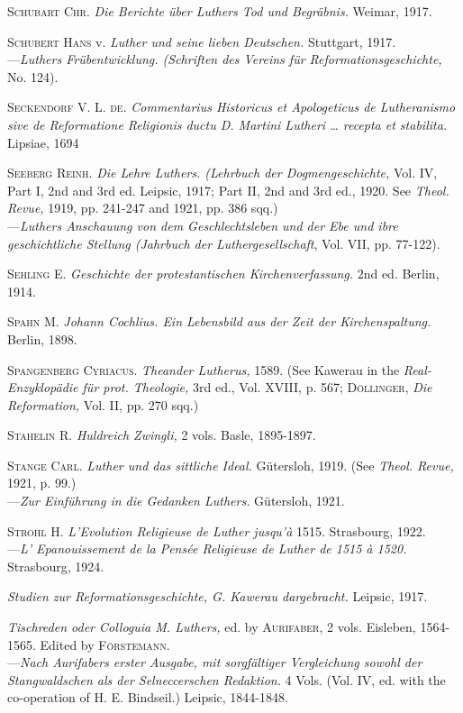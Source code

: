 \textsc{Schubart Chr.} \textit{Die Berichte über Luthers Tod und Begräbnis.} Weimar,
1917.

\textsc{Schubert Hans} v. \textit{Luther und seine lieben Deutschen.} Stuttgart, 1917. \\
---\textit{Luthers Frübentwicklung. (Schriften des Vereins für Reformationsgeschichte,} No. 124).

\textsc{Seckendorf V. L. de.} \textit{Commentarius Historicus et Apologeticus de Lutheranismo sive de Reformatione Religionis ductu D. Martini Lutheri \dots
recepta et stabilita.} Lipsiae, 1694

\textsc{Seeberg Reinh.} \textit{Die Lehre Luthers. (Lehrbuch der Dogmengeschichte,} Vol.
IV, Part I, 2nd and 3rd ed. Leipsic, 1917; Part II, 2nd and 3rd ed., 1920.
See \textit{Theol. Revue,} 1919, pp. 241-247 and 1921, pp. 386 sqq.) \\
---\textit{Luthers Anschauung von dem Geschlechtsleben und der Ebe und ibre
geschichtliche Stellung (Jahrbuch der Luthergesellschaft}, Vol. VII, pp.
77-122).

\textsc{Sehling E.} \textit{Geschichte der protestantischen Kirchenverfassung.} 2nd ed.
Berlin, 1914.

\textsc{Spahn M.} \textit{Johann Cochlius. Ein Lebensbild aus der Zeit der Kirchenspaltung.}
Berlin, 1898.

\textsc{Spangenberg Cyriacus.} \textit{Theander Lutherus,} 1589. (See Kawerau in the
\textit{Real-Enzyklopädie für prot. Theologie,} 3rd ed., Vol. XVIII, p. 567; \textsc{Döllinger},
\textit{Die Reformation,} Vol. II, pp. 270 sqq.)

\textsc{Stahelin R.} \textit{Huldreich Zwingli,} 2 vols. Basle, 1895-1897.

\textsc{Stange Carl.} \textit{Luther und das sittliche Ideal.} Gütersloh, 1919. (See \textit{Theol.
Revue,} 1921, p. 99.) \\
---\textit{Zur Einführung in die Gedanken Luthers.} Gütersloh, 1921.

\textsc{Strohl H.} \textit{L’Evolution Religieuse de Luther jusqu'à} 1515. Strasbourg,
1922. \\
---\textit{L’ Epanouissement de la Pensée Religieuse de Luther de 1515 à 1520.}
Strasbourg, 1924.

\textit{Studien zur Reformationsgeschichte, G. Kawerau dargebracht.} Leipsic, 1917.

\textit{Tischreden oder Colloguia M. Luthers,} ed. by \textsc{Aurifaber,} 2 vols. Eisleben,
1564-1565. Edited by \textsc{Förstemann.} \\
---\textit{Nach Aurifabers erster Ausgabe, mit sorgfältiger Vergleichung sowohl
der Stangwaldschen als der Selneccerschen Redaktion.} 4 Vols. (Vol. IV, ed.
with the co-operation of H. E. Bindseil.) Leipsic, 1844-1848.

